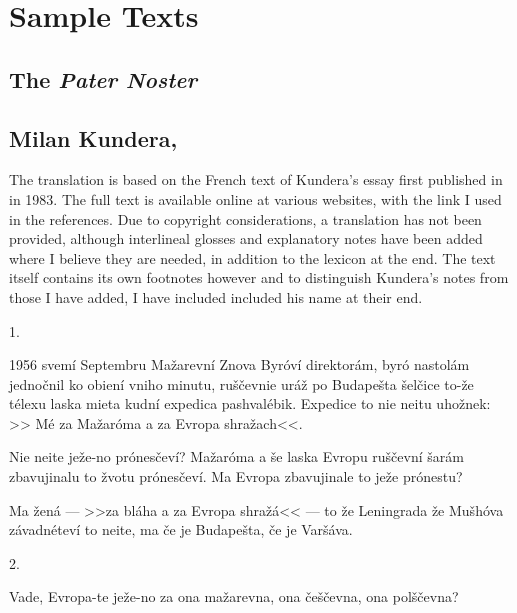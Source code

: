 \chapter{Sample Texts}

\section{The \emph{Pater Noster}}

\section{Milan Kundera, }

{\small
The translation is based on the French text of Kundera's essay  first published in  in 1983. The full text is available online at various websites, with the link I used in the references. Due to copyright considerations, a translation has not been provided, although interlineal glosses and explanatory notes have been added where  I believe they are needed, in addition to the lexicon at the end. The text itself contains its own footnotes however and to distinguish Kundera's notes from those I have added, I have included included his name at their end.
}

\begin{center}1.\end{center}
1956 svemí Septembru Mažarevní Znova Byr\'oví direktorám, byr\'o
nastolám jednočnil ko obiení vniho minutu, ruščevnie uráž
po Budapešta šelčice to-že télexu laska mieta kudní expedica
pashvalébik. Expedice to nie neitu uhožnek: >> Mé za Mažar\'oma a
za Evropa shražach<<.

Nie neite ježe-no pr\'onesčeví? Mažar\'oma a še laska Evropu ruščevní šarám zbavujinalu to žvotu pr\'onesčeví. Ma Evropa zbavujinale to ježe pr\'onestu?

Ma žená --- >>za bláha a za Evropa shražá<< --- to že Leningrada že Mušh\'ova závadnéteví to neite, ma če je Budapešta, če je Varšáva.

\begin{center}2.\end{center}
Vade, Evropa-te ježe-no za ona mažarevna, ona češčevna, ona polščevna?
